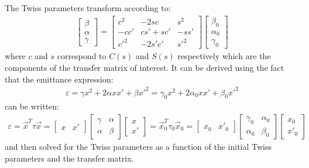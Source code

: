 \documentclass{article}
\numberwithin{equation}{section}
\begin{document}
The Twiss parameters transform according to:
\begin{align}
\begin{bmatrix} \beta \\ \alpha \\ \gamma \end{bmatrix} =
\begin{bmatrix} c^2 & -2sc & s^2 \\ -cc' & cs'+sc' & -ss' \\ c'^2 & -2s'c' & s'^2 \end{bmatrix}
\begin{bmatrix} \beta_0 \\ \alpha_0 \\ \gamma_0 \end{bmatrix}
\end{align}
where $c$ and $s$ correspond to $C(s)$ and $S(s)$ respectively which are the components of the transfer matrix of interest. It can be derived using the fact that the emittance expression:
\begin{align}
\varepsilon = \gamma x^2 + 2 \alpha x x' + \beta x'^2 = \gamma_0 x^2 + 2 \alpha_0 x x' + \beta_0 x'^2
\end{align}
can be written:
\begin{align}
\varepsilon = \vec{x}^T \tau \vec{x} = \begin{bmatrix} x & x' \end{bmatrix} \begin{bmatrix} \gamma & \alpha \\ \alpha & \beta \end{bmatrix} \begin{bmatrix} x \\ x' \end{bmatrix} 
= \vec{x}^T_0 \tau_0 \vec{x}_0 = \begin{bmatrix} x_0 & x'_0 \end{bmatrix} \begin{bmatrix} \gamma_0 & \alpha_0 \\ \alpha_0 & \beta_0 \end{bmatrix} \begin{bmatrix} x_0 \\ x'_0 \end{bmatrix}
\end{align}
and then solved for the Twiss parameters as a function of the initial Twiss parameters and the transfer matrix.
\end{document}
